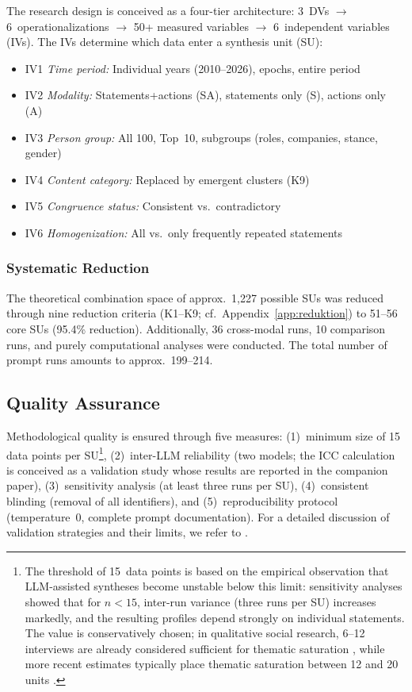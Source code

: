 \documentclass[12pt,a4paper]{article}
\begin{document}
The research design is conceived as a four-tier architecture: 3~DVs $\to$ 6~operationalizations $\to$ 50+ measured variables $\to$ 6~independent variables (IVs). The IVs determine which data enter a synthesis unit (SU):

\begin{itemize}[nosep]
  \item IV1 \emph{Time period:} Individual years (2010--2026), epochs, entire period
  \item IV2 \emph{Modality:} Statements+actions (SA), statements only (S), actions only (A)
  \item IV3 \emph{Person group:} All 100, Top~10, subgroups (roles, companies, stance, gender)
  \item IV4 \emph{Content category:} Replaced by emergent clusters (K9)
  \item IV5 \emph{Congruence status:} Consistent vs.\ contradictory
  \item IV6 \emph{Homogenization:} All vs.\ only frequently repeated statements
\end{itemize}

\subsubsection{Systematic Reduction}

The theoretical combination space of approx.\ 1,227 possible SUs was reduced through nine reduction criteria (K1--K9; cf.\ Appendix~\ref{app:reduktion}) to 51--56 core SUs (95.4\% reduction). Additionally, 36 cross-modal runs, 10 comparison runs, and purely computational analyses were conducted. The total number of prompt runs amounts to approx.\ 199--214.


\subsection{Quality Assurance}
\label{sec:methodik:qualitaet}

Methodological quality is ensured through five measures: (1)~minimum size of 15 data points per SU\footnote{The threshold of 15~data points is based on the empirical observation that LLM-assisted syntheses become unstable below this limit: sensitivity analyses showed that for $n < 15$, inter-run variance (three runs per SU) increases markedly, and the resulting profiles depend strongly on individual statements. The value is conservatively chosen; in qualitative social research, 6--12 interviews are already considered sufficient for thematic saturation \citep{StraussCorbin1990}, while more recent estimates typically place thematic saturation between 12 and 20 units \citep{Guest2006, FugardPotts2015}.}, (2)~inter-LLM reliability (two models; the ICC calculation is conceived as a validation study whose results are reported in the companion paper), (3)~sensitivity analysis (at least three runs per SU), (4)~consistent blinding (removal of all identifiers), and (5)~reproducibility protocol (temperature~0, complete prompt documentation). For a detailed discussion of validation strategies and their limits, we refer to \citet{Geiger2026SWR}.
\end{document}
